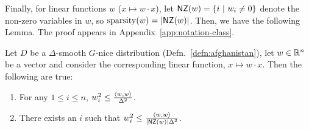 
Finally, for linear functions $w$ ($x \mapsto w \cdot x$), let $\mathsf{NZ}(w) = \{ i
~|~ w_i \neq 0 \}$ denote the non-zero variables in $w$, so $\mathrm{sparsity}(w) =
|\mathsf{NZ}(w)|$. Then, we have the following Lemma. The proof appears in
Appendix~\ref{app:notation-class}.

\begin{lemma} \label{lemma:amsterdam} Let $D$ be a $\Delta$-smooth $G$-nice
distribution (Defn.~\ref{defn:afghanistan}), let $w \in \mathbb{R}^n$ be a vector
and consider the corresponding linear function, $x \mapsto w \cdot x$. Then the
following are true:
\begin{enumerate}
\item For any $1 \leq i \leq n$, $w_i^2 \leq \frac{\langle w, w \rangle}{\Delta^2}$.
\item There exists an $i$ such that $w_i^2 \leq
\frac{\langle w, w \rangle}{|\mathsf{NZ}(w)|\Delta^2}$.
\end{enumerate}
\end{lemma}
